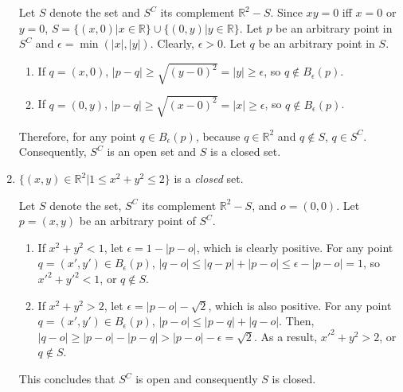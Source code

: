 \documentclass{homework}
\begin{document}
\begin{problem}{5}
\begin{enumerate}
Let $S$ denote the set and $S^C$ its complement $\mathbb{R}^2 - S$. Since $xy = 0$ iff $x = 0$ or $y = 0$, $S = \{(x,0) | x \in \mathbb{R}\} \cup \{(0, y) | y \in \mathbb{R}\}$. Let $p$ be an arbitrary point in $S^C$ and $\epsilon = \min(|x|, |y|)$. Clearly, $\epsilon > 0$. Let $q$ be an arbitrary point in $S$.

\begin{enumerate}
\item If $q = (x, 0)$, $|p - q| \geq \sqrt{(y - 0)^2} = |y| \geq \epsilon$, so $q \notin B_{\epsilon}(p)$.

\item If $q = (0, y)$, $|p - q| \geq \sqrt{(x - 0)^2} = |x| \geq \epsilon$, so $q \notin B_{\epsilon}(p)$.
\end{enumerate}

Therefore, for any point $q \in B_{\epsilon}(p)$, because $q \in \mathbb{R}^2$ and $q \notin S$, $q \in S^C$. Consequently, $S^C$ is an open set and $S$ is a closed set. \QED

\item $\{(x,y) \in \mathbb{R}^2 | 1 \leq x^2 + y^2 \leq 2\}$ is a \emph{closed} set.

Let $S$ denote the set, $S^C$ its complement $\mathbb{R}^2 - S$, and $o = (0, 0)$. Let $p = (x, y)$ be an arbitrary point of $S^C$.

\begin{enumerate}
\item If $x^2 + y^2 < 1$, let $\epsilon = 1 - |p - o|$, which is clearly positive. For any point $q = (x', y') \in B_{\epsilon}(p)$, $|q - o| \leq |q - p| + |p - o| \le \epsilon - |p - o| = 1$, so $x'^2 + y'^2 < 1$, or $q \notin S$.

\item If $x^2 + y^2 > 2$, let $\epsilon = |p - o| - \sqrt{2}$, which is also positive. For any point $q = (x', y') \in B_{\epsilon}(p)$, $|p - o| \leq |p - q| + |q - o|$. Then, $|q - o| \geq |p - o| - |p - q| > |p - o| - \epsilon = \sqrt{2}$. As a result, $x'^2 + y^2 > 2$, or $q \notin S$.
\end{enumerate}

This concludes that $S^C$ is open and consequently $S$ is closed. \QED

\end{enumerate}
\end{problem}
\end{document}
